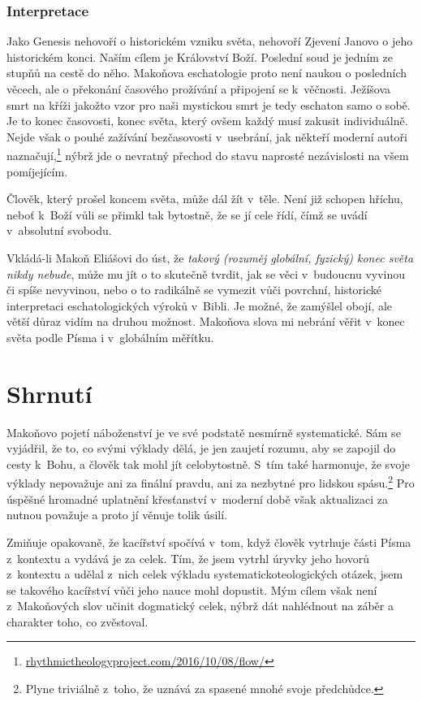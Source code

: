 \subsubsection*{Interpretace}

Jako Genesis nehovoří o historickém vzniku světa, nehovoří Zjevení Janovo o jeho
historickém konci. Naším cílem je Království Boží. Poslední soud je jedním ze
stupňů na cestě do něho. Makoňova eschatologie proto není naukou o posledních
věcech, ale o překonání časového prožívání a připojení se k~věčnosti. Ježíšova
smrt na kříži jakožto vzor pro naši mystickou smrt je tedy eschaton samo o sobě.
Je to konec časovosti, konec světa, který ovšem každý musí zakusit individuálně.
Nejde však o pouhé zažívání bezčasovosti v~usebrání, jak někteří moderní autoři
naznačují,\footnote{\href{https://rhythmictheologyproject.com/2016/10/08/flow/}{rhythmictheologyproject.com/2016/10/08/flow/}}
nýbrž jde o nevratný přechod do stavu naprosté nezávislosti na všem pomíjejícím.

Člověk, který prošel koncem světa, může dál žít v~těle. Není již schopen hříchu,
neboť k~Boží vůli se přimkl tak bytostně, že se jí cele řídí, čímž se uvádí
v~absolutní svobodu.

Vkládá-li Makoň Eliášovi do úst, že \textit{takový (rozuměj globální, fyzický)
konec světa nikdy nebude}, může mu jít o to skutečně tvrdit, jak se věci
v~budoucnu vyvinou či spíše nevyvinou, nebo o to radikálně se vymezit vůči
povrchní, historické interpretaci eschatologických výroků v~Bibli. Je možné, že
zamýšlel obojí, ale větší důraz vidím na druhou možnost. Makoňova slova mi
nebrání věřit v~konec světa podle Písma i v~globálním měřítku.

\section{Shrnutí}

Makoňovo pojetí náboženství je ve své podstatě nesmírně systematické. Sám se
vyjádřil, že to, co svými výklady dělá, je jen zaujetí rozumu, aby se zapojil do
cesty k~Bohu, a člověk tak mohl jít
celobytostně. S~tím také harmonuje, že svoje
výklady nepovažuje ani za finální pravdu, ani za nezbytné pro
lidskou spásu.\footnote{Plyne triviálně z~toho, že uznává za spasené mnohé svoje
předchůdce.} Pro
úspěšné hromadné uplatnění křesťanství v~moderní době však aktualizaci za nutnou
považuje a proto jí věnuje tolik úsilí.

Zmiňuje opakovaně, že kacířství spočívá v~tom, když člověk vytrhuje části Písma
z~kontextu a vydává je za celek. Tím, že jsem vytrhl úryvky jeho hovorů
z~kontextu a udělal z~nich celek výkladu systematicko\-teologických otázek, jsem
se takového kacířství vůči jeho nauce mohl dopustit. Mým cílem však není
z~Makoňových slov učinit dogmatický celek, nýbrž dát nahlédnout na záběr a
charakter toho, co zvěstoval.
